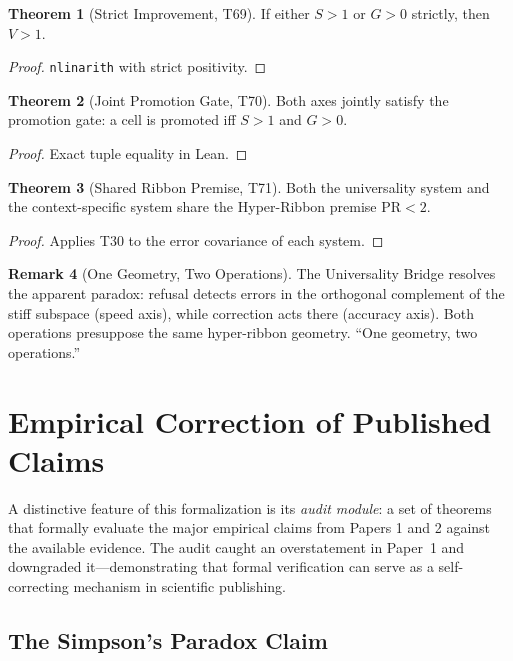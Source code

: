 \documentclass[11pt,a4paper]{article}
\theoremstyle{definition}
\newtheorem{theorem}{Theorem}[section]
\newtheorem{remark}[theorem]{Remark}
\theoremstyle{plain}
\begin{document}
\begin{theorem}[Strict Improvement, T69]
\label{thm:strictcomp}
If either $S > 1$ or $G > 0$ strictly, then $V > 1$.
\end{theorem}
\begin{proof}
\texttt{nlinarith} with strict positivity.
\end{proof}

\begin{theorem}[Joint Promotion Gate, T70]
\label{thm:gate}
Both axes jointly satisfy the promotion gate: a cell is promoted iff $S > 1$ and $G > 0$.
\end{theorem}
\begin{proof}
Exact tuple equality in Lean.
\end{proof}

\begin{theorem}[Shared Ribbon Premise, T71]
\label{thm:shared}
Both the universality system and the context-specific system share the Hyper-Ribbon premise $\mathrm{PR} < 2$.
\end{theorem}
\begin{proof}
Applies T30 to the error covariance of each system.
\end{proof}

\begin{remark}[One Geometry, Two Operations]
\label{rem:onegeom}
The Universality Bridge resolves the apparent paradox: refusal detects errors in the orthogonal complement of the stiff subspace (speed axis), while correction acts there (accuracy axis). Both operations presuppose the same hyper-ribbon geometry. ``One geometry, two operations.''
\end{remark}

\section{Empirical Correction of Published Claims}
\label{sec:audit}

A distinctive feature of this formalization is its \emph{audit module}: a set of theorems that formally evaluate the major empirical claims from Papers 1 and 2 against the available evidence. The audit caught an overstatement in Paper~1 and downgraded it---demonstrating that formal verification can serve as a self-correcting mechanism in scientific publishing.

\subsection{The Simpson's Paradox Claim}
\label{subsec:simpsons}
\end{document}
